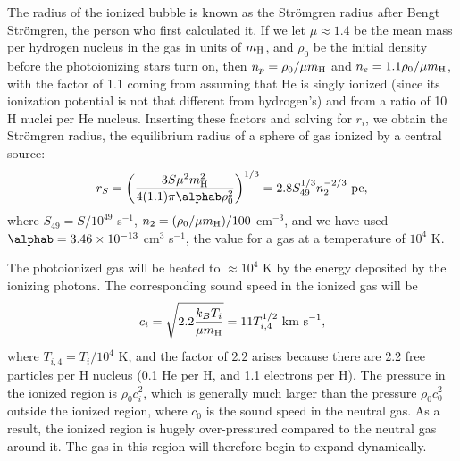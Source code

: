The radius of the ionized bubble is known as the Str\"omgren radius after Bengt Str\"omgren, the person who first calculated it. If we let $\mu\approx 1.4$ be the mean mass per hydrogen nucleus in the gas in units of $m_{\rm H}$, and $\rho_0$ be the initial density before the photoionizing stars turn on, then $n_p = \rho_0/\mu m_{\rm H}$ and $n_e = 1.1 \rho_0/\mu m_{\rm H}$, with the factor of 1.1 coming from assuming that He is singly ionized (since its ionization potential is not that different from hydrogen's) and from a ratio of 10 H nuclei per He nucleus. Inserting these factors and solving for $r_i$, we obtain the Str\"omgren radius, the equilibrium radius of a sphere of gas ionized by a central source:
\begin{equation}
r_S = \left(\frac{3 S \mu^2 m_{\rm H}^2}{4(1.1) \pi \alphab \rho_0^2}\right)^{1/3} = 2.8 S_{49}^{1/3} n_2^{-2/3}\mbox{ pc},
\end{equation}
where $S_{49} = S/10^{49}$ s$^{-1}$, $n_2 = (\rho_0/\mu m_{\rm H})/100$ cm$^{-3}$, and we have used $\alphab = 3.46\times 10^{-13}$ cm$^3$ s$^{-1}$, the value for a gas at a temperature of $10^4$ K.

The photoionized gas will be heated to $\approx 10^4$ K by the energy deposited by the ionizing photons. The corresponding sound speed in the ionized gas will be
\begin{equation}
c_i = \sqrt{2.2 \frac{k_B T_i}{\mu m_{\rm H}}} = 11 T_{i,4}^{1/2}\mbox{ km s}^{-1},
\end{equation}
where $T_{i,4} = T_i/10^4$ K, and the factor of $2.2$ arises because there are 2.2 free particles per H nucleus (0.1 He per H, and 1.1 electrons per H). The pressure in the ionized region is $\rho_0 c_i^2$, which is generally much larger than the pressure $\rho_0 c_0^2$ outside the ionized region, where $c_0$ is the sound speed in the neutral gas. As a result, the ionized region is hugely over-pressured compared to the neutral gas around it. The gas in this region will therefore begin to expand dynamically.

